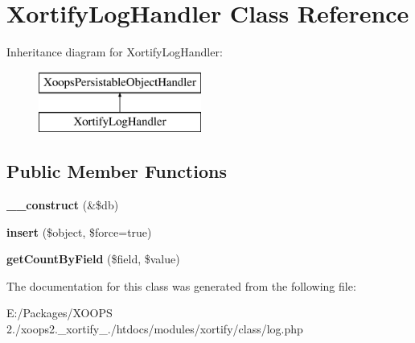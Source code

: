 \hypertarget{class_xortify_log_handler}{\section{Xortify\-Log\-Handler Class Reference}
\label{class_xortify_log_handler}
}
Inheritance diagram for Xortify\-Log\-Handler\-:\begin{figure}[H]
\begin{center}
\leavevmode
\includegraphics[height=2.000000cm]{class_xortify_log_handler}
\end{center}
\end{figure}
\subsection*{Public Member Functions}
\begin{DoxyCompactItemize}
\item 
\hypertarget{class_xortify_log_handler_a962bc72933e07248ad41490401f47c0b}{{\bfseries \-\_\-\-\_\-construct} (\&\$db)}\label{class_xortify_log_handler_a962bc72933e07248ad41490401f47c0b}

\item 
\hypertarget{class_xortify_log_handler_a57dfad4e6e30923dae4a467f1d5beae6}{{\bfseries insert} (\$object, \$force=true)}\label{class_xortify_log_handler_a57dfad4e6e30923dae4a467f1d5beae6}

\item 
\hypertarget{class_xortify_log_handler_aebccef05e4ab63395e09852d18a13d20}{{\bfseries get\-Count\-By\-Field} (\$field, \$value)}\label{class_xortify_log_handler_aebccef05e4ab63395e09852d18a13d20}

\end{DoxyCompactItemize}


The documentation for this class was generated from the following file\-:\begin{DoxyCompactItemize}
\item 
E\-:/\-Packages/\-X\-O\-O\-P\-S 2./xoops2.\-\_\-xortify\-\_./htdocs/modules/xortify/class/log.\-php\end{DoxyCompactItemize}
